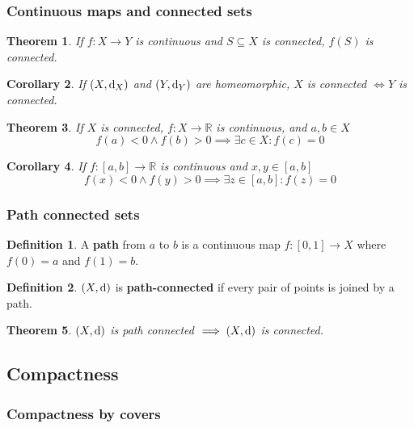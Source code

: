 \documentclass[12pt]{article}
\newtheorem{thm}{Theorem}[section]
\newtheorem{cor}[thm]{Corollary}
\theoremstyle{definition}
\newtheorem{defn}{Definition}[section]
\renewcommand{\d}{{\textnormal{d}}}
\begin{document}
\subsubsection{Continuous maps and connected sets}

\begin{thm}
	If $f : X \to Y$ is continuous and $S \subseteq X$ is connected, $f(S)$ is connected.
\end{thm}

\begin{cor}
	If $(X, \d_X)$ and $(Y, \d_Y)$ are homeomorphic, $X$ is connected $\iff Y$ is connected.
\end{cor}

\begin{thm}
	If $X$ is connected, $f : X \to \mathbb{R}$ is continuous, and $a, b \in X$
	$$f(a) < 0 \land f(b) > 0 \implies \exists c \in X : f(c) = 0$$
\end{thm}

\begin{cor}
	If $f : [a, b] \to \mathbb{R}$ is continuous and $x, y \in [a, b]$
	$$f(x) < 0 \land f(y) > 0 \implies \exists z \in [a, b] : f(z) = 0$$
\end{cor}

\subsubsection{Path connected sets}

\begin{defn}
	A \textbf{path} from $a$ to $b$ is a continuous map $f : [0, 1] \to X$ where $f(0) = a$ and $f(1) = b$.
\end{defn}

\begin{defn}
	$(X, \d)$ is \textbf{path-connected} if every pair of points is joined by a path.
\end{defn}

\begin{thm}
	$(X, \d)$ is path connected $\implies (X, \d)$ is connected.
\end{thm}

\subsection{Compactness}

\subsubsection{Compactness by covers}
\end{document}

